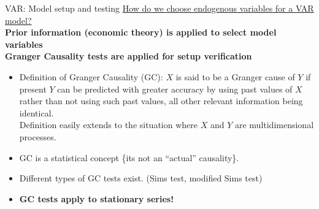 \documentclass[usenames,dvipsnames]{beamer}
\begin{document}
\begin{frame}{VAR: Model setup and testing}
\small
\underline{How do we choose endogenous variables for a VAR model?}\\
\vspace{5mm}
\textbf{Prior information (economic theory) is applied to select model variables}\\
\vspace{5mm}
\textbf{Granger Causality tests are applied for setup verification}\\
	\begin{itemize}
	\item Definition of Granger Causality (GC): $X$ is said to be a Granger cause of $Y$ if present $Y$ 				can be predicted with greater accuracy by using past values of $X$ rather than not using 			such past values, all other relevant information being identical. \\
	\vspace*{2mm}
			Definition easily extends to the situation where $X$ and $Y$ are multidimensional 					processes.
	\item GC is a statistical concept \{its not an ``actual'' causality\}.
	\item Different types of GC tests exist. (Sims test, modified Sims test)
	\item \textbf{GC tests apply to stationary series!}
	\end{itemize}
\end{frame}
\end{document}
